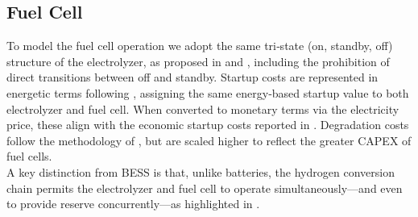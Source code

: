 \documentclass{article}
\begin{document}
\subsection{Fuel Cell}
\label{SEC:FuelCell}

To model the fuel cell operation we adopt the same tri‐state (on, standby, off) structure of the electrolyzer, as proposed in \cite{You2016} and \cite{Shehzad2020}, including the prohibition of direct transitions between off and standby. Startup costs are represented in energetic terms following \cite{You2016}, assigning the same energy‐based startup value to both electrolyzer and fuel cell. When converted to monetary terms via the electricity price, these align with the economic startup costs reported in \cite{Zheng2022}. Degradation costs follow the methodology of \cite{Matute2021}, but are scaled higher to reflect the greater CAPEX of fuel cells. \\ A key distinction from BESS is that, unlike batteries, the hydrogen conversion chain permits the electrolyzer and fuel cell to operate simultaneously—and even to provide reserve concurrently—as highlighted in \cite{Shehzad2020}.
\end{document}
